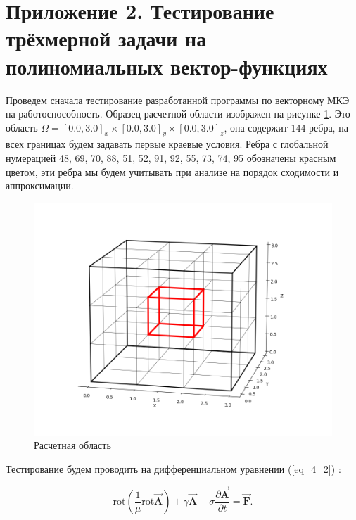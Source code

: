 \hypertarget{a2}{}
\chapter*{Приложение 2. Тестирование трёхмерной задачи на полиномиальных вектор-функциях} 

Проведем сначала тестирование разработанной программы по векторному МКЭ на работоспособность. Образец расчетной области изображен на рисунке \ref{fig:exampleOfArea}. Это область $\Omega = [0.0, 3.0]_x \times [0.0, 3.0]_y \times [0.0, 3.0]_z$, она содержит 144 ребра, на всех границах будем задавать первые краевые условия. Ребра с глобальной нумерацией 48, 69, 70, 88, 51, 52, 91, 92, 55, 73, 74, 95 обозначены красным цветом, эти ребра мы будем учитывать при анализе на порядок сходимости и аппроксимации. 

\begin{figure}
	\centering
	\includegraphics[width=0.8\linewidth]{images/3D_grid_example.png}
	\caption{Расчетная область}
	\label{fig:exampleOfArea}
\end{figure}

Тестирование будем проводить на дифференциальном уравнении (\ref{eq_4_2}) :

\begin{equation} \label{eq_4_2}
	\text{rot} \left(\frac{1}{\mu} \text{rot} \overrightarrow{\textbf{A}}\right) + \gamma \overrightarrow{\textbf{A}} + \sigma \frac{\partial \overrightarrow{\textbf{A}}}{\partial t} = \overrightarrow{\textbf{F}}.
\end{equation}

